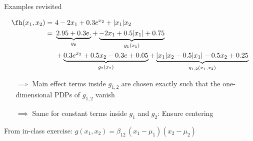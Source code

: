 \documentclass[11pt,compress,t,notes=noshow, aspectratio=169, xcolor=table]{beamer}
\begin{document}
\begin{frame}{Examples revisited}

    \begin{example}
        \begin{align*}
            \fh(x_1, x_2) =\,&\,4 - 2x_1 + 0.3 e^{x_2} + |x_1|x_2 \\
                =\,&\,\underbrace{2.95 + 0.3 e.}_{g_\emptyset} + \underbrace{-2x_1 + 0.5|x_1| + 0.75}_{g_1(x_1)} \\
                \,&\,+ \underbrace{0.3 e^{x_2} + 0.5x_2 - 0.3e + 0.05}_{g_2(x_2)} + \underbrace{|x_1| x_2 - 0.5 |x_1| - 0.5 x_2 + 0.25}_{g_{1,2}(x_1, x_2)}
        \end{align*}
        \begin{itemize}
            \item[$\implies$] Main effect terms inside $g_{1,2}$ are chosen exactly such that the one-dimensional PDPs of $g_{1,2}$ vanish
            \item[$\implies$] Same for constant terms inside $g_1$ and $g_2$: Ensure centering
        \end{itemize}
    \end{example}

    \pause
    \begin{example}
        From in-class exercise:
        $
        g(x_1,x_2)
         = \beta_{12}\,(x_1-\mu_1)(x_2-\mu_2)
        $
    \end{example}
    
\end{frame}


    
\end{document}
